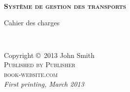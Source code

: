\documentclass[11pt,fleqn]{book} %
\makeatletter
\newcommand{\ravi}{\href{mailto:pachy.ravi@gmail.com}{Ravi~\textsc{Pachy}}\xspace}
\newcommand{\mj}{\href{mailto:mehdi-jonathan@hotmail.fr}{Mehdi-Jonathan~\textsc{Cadon}}\xspace}
\newcommand{\lionel}{\href{mailto:lionel.gairoard@gmail.com}{Lionel~\textsc{Gairoard}}\xspace}
\newcommand{\ibrahima}{\href{mailto:ibbaldes@yahoo.fr}{Ibrahima~Sory~\textsc{Balde}}\xspace}
\newcommand{\khady}{\href{mailto:takamor91@yahoo.fr}{Ahoua~Khady~\textsc{Toure}}\xspace}
\renewcommand{\title}{Système de gestion des transports}
\newcommand{\subject}{Cahier des charges}
\makeatother
\begin{document}

\begingroup
\thispagestyle{empty}
\centering
\vspace*{9cm}
\par\normalfont\fontsize{35}{35}\sffamily\selectfont\scshape
{\bfseries\title}\par %
\vspace*{1cm}
\subject\par %
\endgroup


\newpage
~\vfill
\thispagestyle{empty}

\noindent Copyright \copyright\ 2013 John Smith\\ %

\noindent \textsc{Published by Publisher}\\ %

\noindent \textsc{book-website.com}\\ %


\noindent \textit{First printing, March 2013} %

\end{document}

